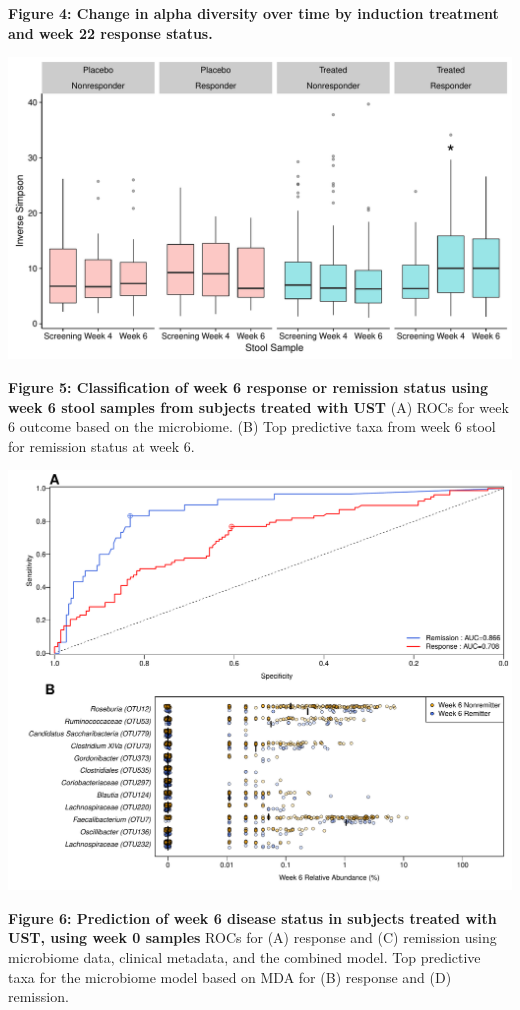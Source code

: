 \documentclass[11pt,]{article}
\begin{document}
\textbf{Figure 4: Change in alpha diversity over time by induction
treatment and week 22 response status.}

\includegraphics{figures/Figure4_wk046.adivXvisitXindtrtXrelRSPwk22.pdf}

\newpage

\textbf{Figure 5: Classification of week 6 response or remission status
using week 6 stool samples from subjects treated with UST} (A) ROCs for
week 6 outcome based on the microbiome. (B) Top predictive taxa from
week 6 stool for remission status at week 6.

\includegraphics{figures/Figure5_wk6Xwk6.pdf}

\newpage

\textbf{Figure 6: Prediction of week 6 disease status in subjects
treated with UST, using week 0 samples} ROCs for (A) response and (C)
remission using microbiome data, clinical metadata, and the combined
model. Top predictive taxa for the microbiome model based on MDA for (B)
response and (D) remission.
\end{document}
